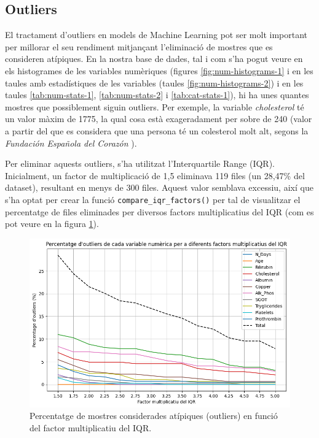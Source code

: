 \subsection{Outliers}
El tractament d'outliers en models de Machine Learning pot ser molt important per millorar el seu rendiment mitjançant l'eliminació de mostres que es consideren atípiques. En la nostra base de dades, tal i com s'ha pogut veure en els histogrames de les variables numèriques (figures \ref{fig:num-histograms-1} i en les taules amb estadístiques de les variables (taules \ref{fig:num-histograms-2}) i en les taules \ref{tab:num-stats-1}, \ref{tab:num-stats-2} i \ref{tab:cat-stats-1}), hi ha unes quantes mostres que possiblement siguin outliers. Per exemple, la variable \textit{cholesterol} té un valor màxim de 1775, la qual cosa està exageradament per sobre de 240 (valor a partir del que es considera que una persona té un colesterol molt alt, segons la \textit{Fundación Española del Corazón} \cite{fundacioncorazon2023colesterol}).

Per eliminar aquests outliers, s'ha utilitzat l'Interquartile Range (IQR). Inicialment, un factor de multiplicació de 1,5 eliminava 119 files (un 28,47\% del dataset), resultant en menys de 300 files. Aquest valor semblava excessiu, així que s'ha optat per crear la funció \texttt{compare\_iqr\_factors()} per tal de visualitzar el percentatge de files eliminades per diversos factors multiplicatius del IQR (com es pot veure en la figura \ref{fig:iqr-factors}).

\begin{figure}[H]
	\centering
	\includegraphics[width=0.85\linewidth]{img/iqr_factors}
    \caption{Percentatge de mostres considerades atípiques (outliers) en funció del factor multiplicatiu del IQR.}
    \label{fig:iqr-factors}
\end{figure}

